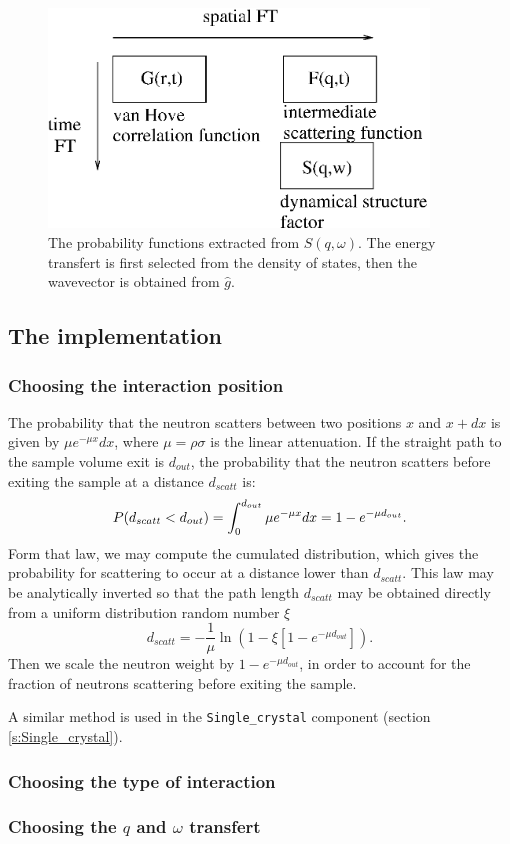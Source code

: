 \begin{figure}
  \begin{center}
    \includegraphics[width=0.9\textwidth]{figures/GFS.eps}
  \end{center}
\caption{The probability functions extracted from $S(q,\omega)$. The energy transfert is first selected from the density of states, then the wavevector is obtained from $\hat g$.}
\label{f:isotropic-sqw}
\end{figure}


\subsection{The implementation}
\subsubsection{Choosing the interaction position}

The probability that the neutron scatters between two positions $x$ and $x+dx$ is given by $\mu e^{-\mu x}dx$, where $\mu = \rho\sigma$ is the linear attenuation. If the straight path to the sample volume exit is $d_{out}$, the probability that the neutron scatters before exiting the sample at a distance $d_{scatt}$ is:
\begin{equation}
P(d_{scatt} < d_{out}) = \int_0^{d_{out}} \mu e^{-\mu x}dx = 1 - e^{-\mu d_{out}}. \\
\end{equation}
Form that law, we may compute the cumulated distribution, which gives the probability for scattering to occur at a distance lower than $d_{scatt}$. This law may be analytically inverted so that the path length $d_{scatt}$ may be obtained directly from a uniform distribution random number $\xi$
\begin{equation}
d_{scatt} = -\frac{1}{\mu} \ln(1 - \xi[1 -e^{-\mu d_{out}}]).
\end{equation}
Then we scale the neutron weight by $1 - e^{-\mu d_{out}}$, in order to account for the fraction of neutrons scattering before exiting the sample.

A similar method is used in the \verb+Single_crystal+ component (section \ref{s:Single_crystal}).


\subsubsection{Choosing the type of interaction}
\subsubsection{Choosing the $q$ and $\omega$ transfert}